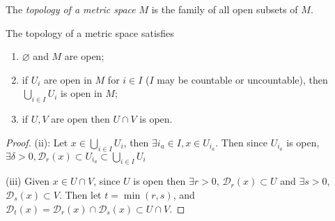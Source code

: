 \begin{definition}
	The \textit{topology of a metric space} \( M \) is the family of all open subsets of \( M \).
\end{definition}
\begin{proposition}
	The topology of a metric space satisfies
	\begin{enumerate}
		\item \( \varnothing \) and \( M \) are open;
		\item if \( U_i \) are open in \( M \) for \( i \in I \) (\( I \) may be countable or uncountable), then \( \bigcup_{i \in I} U_i \) is open in \( M \);
		\item if \( U, V \) are open then \( U \cap V \) is open.
	\end{enumerate}
\end{proposition}
\begin{proof}
	(ii): Let \( x \in \bigcup_{i \in I} U_i \), then \( \exists i_a \in I, x \in U_{i_a} \).
	Then since \( U_{i_a} \) is open, \( \exists \delta > 0, \mathcal D_r(x) \subset U_{i_a} \subset \bigcup_{i \in I} U_i \)

	(iii) Given \( x \in U \cap V \), since \( U \) is open then \( \exists r > 0 \), \( \mathcal D_r(x) \subset U \) and \( \exists s > 0 \), \( \mathcal D_s(x) \subset V \).
	Then let \( t = \min(r,s) \), and \( \mathcal D_t(x) = \mathcal D_r(x) \cap \mathcal D_s(x) \subset U \cap V \).
\end{proof}

